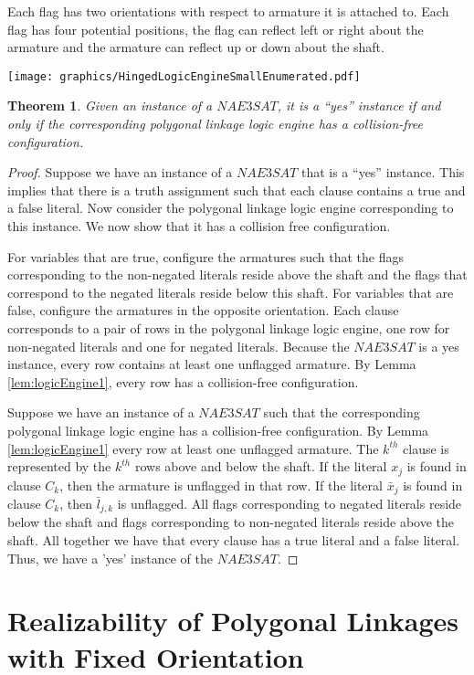 \documentclass[10pt]{CSUNthesis}
\theoremstyle{plain}%
\newtheorem{thm}{Theorem}
\theoremstyle{definition}
\theoremstyle{remark}
\begin{document}
Each flag has two orientations with respect to armature it is attached to.  Each flag has four potential positions, the flag can reflect left or right about the armature and the armature can reflect up or down about the shaft.

\begin{minipage}{\linewidth}
\begin{center}
\texttt{[image: graphics/HingedLogicEngineSmallEnumerated.pdf]}
\label{fig:HingedLogicEngineSmallEnumerated.pdf}
\end{center}
\end{minipage}

\begin{thm}\label{thm:chp2-HingedPolygons-1}
 Given an instance of a $NAE3SAT$,  it is a ``yes'' instance if and only if the 
corresponding polygonal linkage logic engine has a collision-free configuration.  
\end{thm}
\begin{proof}
Suppose we have an instance of a $NAE3SAT$ that is a ``yes'' instance. This implies that there is a 
truth assignment such that each clause contains a true and a false literal. Now consider the polygonal linkage logic 
engine corresponding to this instance. We now 
show that it has a collision free configuration.

For variables that are true, configure the armatures such that the flags corresponding to the 
non-negated literals reside above the 
shaft and the flags that correspond to the negated literals reside below this shaft.  For variables 
that are false, configure the 
armatures in the opposite orientation.  Each clause corresponds to a pair of rows in 
the polygonal linkage logic engine, one row for non-negated literals and one for negated literals.  Because the 
$NAE3SAT$ is a yes instance, every row contains at least one unflagged armature.  
By Lemma \ref{lem:logicEngine1}, every row  has a collision-free configuration.

Suppose we have an instance of a $NAE3SAT$ such that the corresponding polygonal linkage logic engine has a 
collision-free configuration. By Lemma \ref{lem:logicEngine1} every row at least one unflagged 
armature.  The $k^{th}$ clause is represented by the $k^{th}$ rows above and below the shaft. If the 
literal $x_j$ is found in clause $C_k$, then the armature is unflagged in that row. If the literal 
$\bar{x}_j$ is found in clause $C_k$, then $\bar{l}_{j,k}$ is unflagged.  All flags 
corresponding to negated literals reside below the shaft and flags corresponding to non-negated 
literals reside above the shaft.  All together we have that every clause has a true literal and a 
false literal.  Thus, we have a 'yes' instance of the $NAE3SAT$.
\end{proof}\chapter{Realizability of Polygonal Linkages with Fixed Orientation\label{chapter:polygonalLinkage}} 
\end{document}
